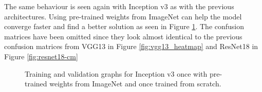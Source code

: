 \begin{table}[!h] \centering
{}
\caption{Hyper parameters for Inception v3 optimized with SigOpt. First row shows hyperparameters training the architecture from scratch. Second row used pre-trained weights from ImageNet}
\label{tbl:Inceptionv3_overview}
\end{table}

\quad

The same behaviour is seen again with Inception v3 as with the previous architectures. Using pre-trained weights from ImageNet can help the model converge faster and find a better solution as seen in Figure \ref{fig:inception-graph}. The confusion matrices have been omitted since they look almost identical to the previous confusion matrices from VGG13 in Figure \ref{fig:vgg13_heatmap} and ResNet18 in Figure \ref{fig:resnet18-cm} \\


\begin{figure}[!h]
\centering
\caption{Training and validation graphs for Inception v3 once with pre-trained weights from ImageNet and once trained from scratch.}
\label{fig:inception-graph}
\end{figure}

